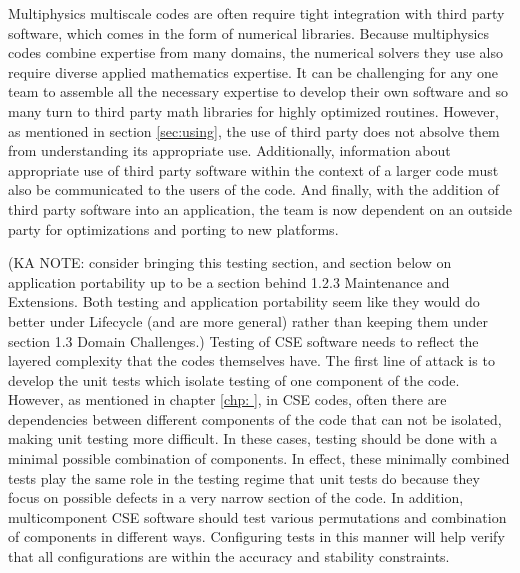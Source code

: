 Multiphysics multiscale codes are often require tight integration with third party software, which comes
in the form of numerical libraries. Because multiphysics codes combine
expertise from many domains, the numerical solvers they use also
require diverse applied mathematics expertise. It can be challenging 
for any one team to assemble all the necessary expertise to develop their own software and so many turn to third party math libraries for highly optimized routines.  However, as mentioned in section \ref{sec:using}, the use of
third party does not absolve them from understanding its appropriate
use.  Additionally, information about appropriate use of third party
software within the context of a larger code must also be communicated
to the users of the code.  And finally, with the addition of third party software into an application, the team is now dependent on an outside party for optimizations and porting to new platforms.

(KA NOTE: consider bringing this testing section, and section below on application portability up to be a section behind 1.2.3 Maintenance and Extensions.  Both testing and application portability seem like they would do better under Lifecycle (and are more general) rather than keeping them under section 1.3 Domain Challenges.)
Testing of CSE software needs to reflect the layered complexity that
the codes themselves have. The first line of attack is to develop the unit tests which isolate testing of one component of the code.
However, as mentioned in chapter \ref{chp: }, in CSE codes, often there are dependencies between different components of the code that can not be isolated, making unit testing more difficult. In these cases, testing should be done with a minimal possible combination of
components.  In effect, these
minimally combined tests play the same role in the testing regime that
unit tests do because they focus on possible defects in a very narrow
section of the code. In addition, multicomponent CSE software should test various 
permutations and combination of components in different ways. Configuring tests in this manner will help verify
that all configurations are within the accuracy and stability
constraints.  

